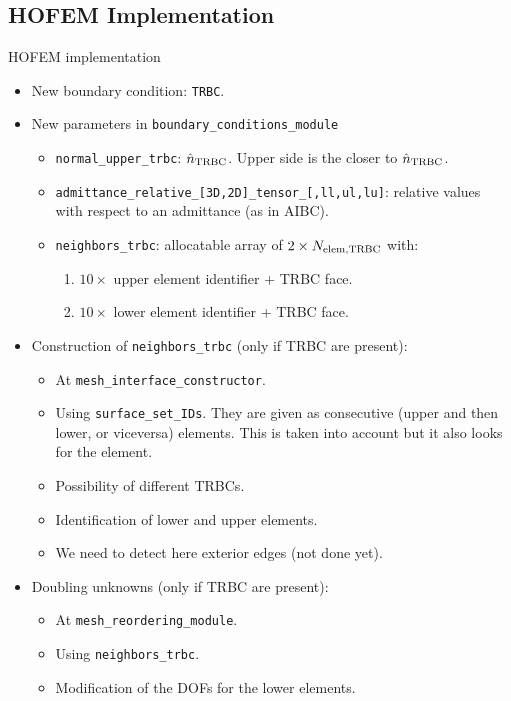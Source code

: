 \subsection{HOFEM Implementation}

\begin{frame}[allowframebreaks]{HOFEM implementation}
  \begin{itemize}
    \item New boundary condition: \texttt{TRBC}.
    \item New parameters in \texttt{boundary\_conditions\_module}
    \begin{itemize}
      \item \texttt{normal\_upper\_trbc}: $\hat{n}_{\rm TRBC}$. Upper side is the closer to $\hat{n}_{\rm TRBC}$.
      \item \texttt{admittance\_relative\_[3D,2D]\_tensor\_[,ll,ul,lu]}: relative values with respect to an admittance (as in AIBC).
      \item \texttt{neighbors\_trbc}: allocatable array of $2\times N_{\rm elem, TRBC}$ with:
      \begin{enumerate}
        \item $10\times$ upper element identifier + TRBC face.
        \item $10\times$ lower element identifier + TRBC face.
      \end{enumerate}
    \end{itemize}

    \framebreak

    \item Construction of \texttt{neighbors\_trbc} (only if TRBC are present):
    \begin{itemize}
      \item At \texttt{mesh\_interface\_constructor}.
      \item Using \texttt{surface\_set\_IDs}. They are given as consecutive (upper and then lower, or viceversa) elements. \alert{This is taken into account but it also looks for the element.}
      \item Possibility of different TRBCs.
      \item Identification of lower and upper elements.
      \item \alert{We need to detect here exterior edges (not done yet).}
    \end{itemize}
    \item Doubling unknowns (only if TRBC are present):
    \begin{itemize}
      \item At \texttt{mesh\_reordering\_module}.
      \item Using \texttt{neighbors\_trbc}.
      \item Modification of the DOFs for the lower elements.
    \end{itemize}   


\end{itemize}
\end{frame}
